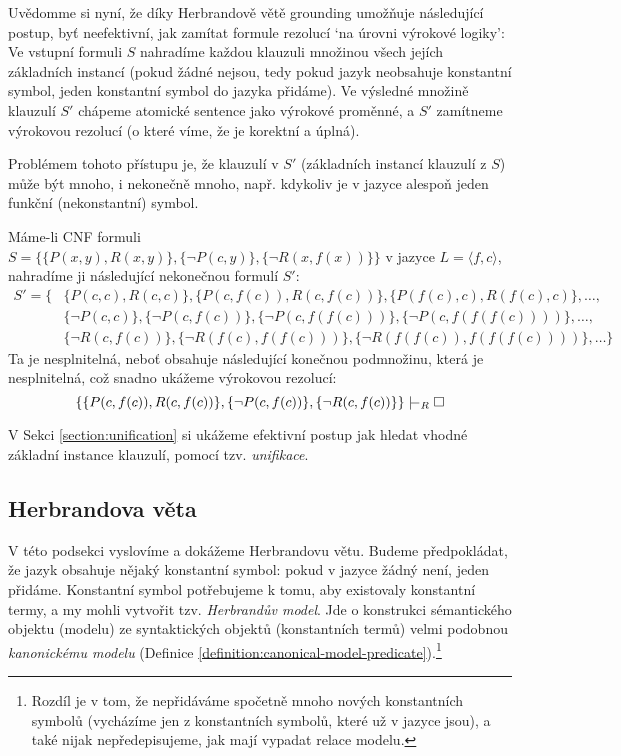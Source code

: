 Uvědomme si nyní, že díky Herbrandově větě grounding umožňuje následující postup, byť neefektivní, jak zamítat formule rezolucí `na úrovni výrokové logiky': Ve vstupní formuli $S$ nahradíme každou klauzuli množinou všech jejích základních instancí (pokud žádné nejsou, tedy pokud jazyk neobsahuje konstantní symbol, jeden konstantní symbol do jazyka přidáme). Ve výsledné množině klauzulí $S'$ chápeme atomické sentence jako výrokové proměnné, a $S'$ zamítneme výrokovou rezolucí (o které víme, že je korektní a úplná). 

Problémem tohoto přístupu je, že klauzulí v $S'$ (základních instancí klauzulí z $S$) může být mnoho, i nekonečně mnoho, např. kdykoliv je v jazyce alespoň jeden funkční (nekonstantní) symbol. 

\begin{example}
Máme-li CNF formuli $S=\{\{P(x,y),R(x,y)\},\{\neg P(c,y)\},\{\neg R(x,f(x))\}\}$ v jazyce $L=\langle f,c\rangle$, nahradíme ji následující nekonečnou formulí $S'$:
\begin{align*}
    S'=\{&\{P(c,c),R(c,c)\},\{P(c,f(c)),R(c,f(c))\},\{P(f(c),c),R(f(c),c)\},\dots,\\ 
    &\{\neg P(c,c)\}, \{\neg P(c,f(c))\},\{\neg P(c,f(f(c)))\},\{\neg P(c,f(f(f(c))))\}, \dots,\\
    &\{\neg R(c,f(c))\}, \{\neg R(f(c),f(f(c)))\},\{\neg R(f(f(c)),f(f(f(c))))\},\dots\}    
\end{align*}
Ta je nesplnitelná, neboť obsahuje následující konečnou podmnožinu, která je nesplnitelná, což snadno ukážeme výrokovou rezolucí:
$$
\{\{P(c,f(c)),R(c,f(c))\},\{\neg P(c,f(c))\},\{\neg R(c,f(c))\}\}\proves_R\square
$$
\end{example}
V Sekci \ref{section:unification} si ukážeme efektivní postup jak hledat vhodné základní instance klauzulí, pomocí tzv. \emph{unifikace}.


\subsection{Herbrandova věta}

V této podsekci vyslovíme a dokážeme Herbrandovu větu. Budeme předpokládat, že jazyk obsahuje nějaký konstantní symbol: pokud v jazyce žádný není, jeden přidáme. Konstantní symbol potřebujeme k tomu, aby existovaly konstantní termy, a my mohli vytvořit tzv. \emph{Herbrandův model}. Jde o konstrukci sémantického objektu (modelu) ze syntaktických objektů (konstantních termů) velmi podobnou \emph{kanonickému modelu} (Definice \ref{definition:canonical-model-predicate}).\footnote{Rozdíl je v tom, že nepřidáváme spočetně mnoho nových konstantních symbolů (vycházíme jen z konstantních symbolů, které už v jazyce jsou), a také nijak nepředepisujeme, jak mají vypadat relace modelu.}

